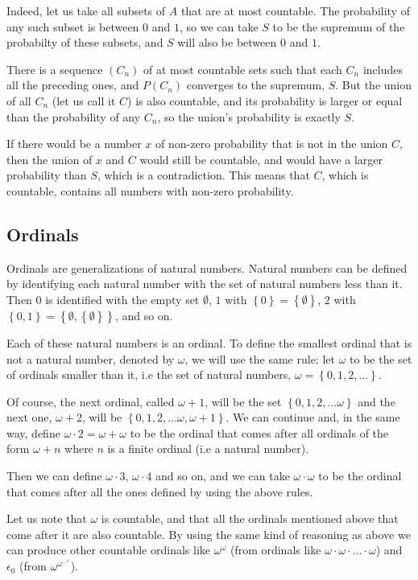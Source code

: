 \documentclass[a4paper
,draft
]{article}
\newcommand{\multime}[1]{\left\{ #1 \right\}}
\begin{document}
Indeed, let us take all subsets of $A$ that are at most countable. The
probability of any such subset is between $0$ and $1$, so we can take
$S$ to be the supremum of the probabilty of these subsets, and
$S$ will also be between $0$ and $1$.

There is a sequence $(C_n)$ of at most countable sets such that each $C_n$
includes all the preceding ones, and $P(C_n)$ converges to the supremum, $S$.
But the union of all $C_n$ (let us call it $C$) is also countable,
and its probability is larger or equal than the probability of any $C_n$,
so the union's probability is exactly $S$.

If there would be a number $x$ of non-zero probability that is not in the
union $C$, then the union of $x$ and $C$ would still be countable, and
would have a larger probability than $S$, which is a contradiction.
This means that $C$, which is countable, contains all numbers with non-zero
probability.

\subsection{Ordinals}
\label{sec:ordinals}

Ordinals are generalizations of natural numbers. Natural numbers can be
defined by identifying each natural number with the set of natural numbers less
than it. Then $0$ is identified with the empty set $\emptyset$,
$1$ with $\multime{0}=\multime{\emptyset}$,
$2$ with $\multime{0, 1}=\multime{\emptyset, \multime{\emptyset}}$,
and so on.

Each of these natural numbers is an ordinal. To define the smallest ordinal
that is not a natural number, denoted by $\omega$, we will use the
same rule: let $\omega$ to be the set of ordinals smaller than it, i.e
the set of natural numbers, $\omega=\multime{0, 1, 2, \dots}$.

Of course, the next ordinal, called $\omega + 1$, will be the set
$\multime{0, 1, 2, \dots \omega}$ and the next one,
$\omega+2$, will be $\multime{0, 1, 2, \dots \omega, \omega+1}$. We can
continue and, in the same way, define $\omega\cdot 2=\omega+\omega$ to be
the ordinal that comes after all ordinals of the form $\omega+n$
where $n$ is a finite ordinal (i.e a natural number).

Then we can define $\omega\cdot 3$, $\omega\cdot 4$ and so on, and we can
take $\omega\cdot \omega$ to be the ordinal that comes after all the ones
defined by using the above rules.

Let us note that $\omega$ is countable, and that all the ordinals mentioned
above that come after it are also countable. By using the same kind of
reasoning as above we can produce other countable ordinals like
$\omega^\omega$ (from ordinals like $\omega\cdot\omega\cdot\dots\cdot\omega$)
and $\epsilon_0$ (from $\omega^{\omega^{\cdots^\omega}}$).
\end{document}
